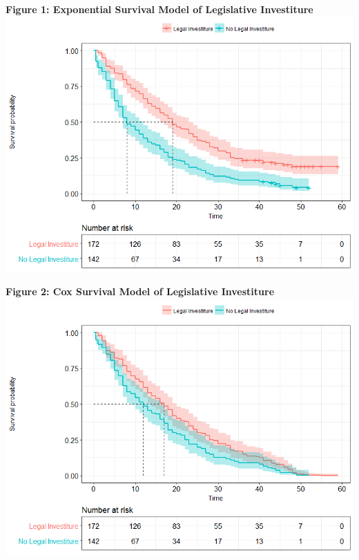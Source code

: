 \documentclass[12pt]{article}\usepackage[]{graphicx}\usepackage[]{color}
\begin{document}
\begin{flushleft}
\begin{center}
\textbf{Figure 1: Exponential Survival Model of Legislative Investiture}
\includegraphics[scale=.65]{Surv}
\end{center}


\clearpage
\begin{center}
\textbf{Figure 2: Cox Survival Model of Legislative Investiture}
\includegraphics[scale=.65]{Cox}
\end{center}



\end{flushleft}
\end{document}
